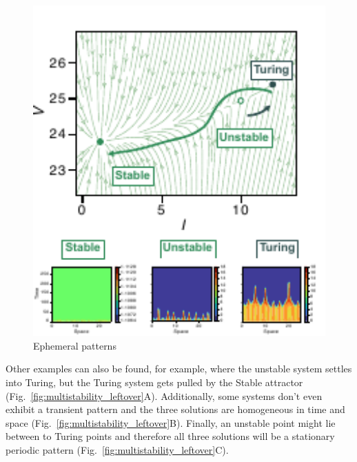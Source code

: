 \begin{figure}[H] %
    \centering
    \begin{adjustbox}{center}
        \includegraphics[width=1\textwidth]{chapters/Chapter 1/multistability2} %
    \end{adjustbox}
    \caption{Ephemeral patterns}
    \label{fig:multistability2} %
\end{figure}

Other examples can also be found, for example, where the unstable system settles into Turing, but the Turing system gets pulled by the Stable attractor (Fig.~\ref{fig:multistability_leftover}A). Additionally, some systems don't even exhibit a transient pattern and the three solutions are homogeneous in time and space (Fig.~\ref{fig:multistability_leftover}B). Finally, an unstable point might lie between to Turing points and therefore all three solutions will be a stationary periodic pattern (Fig.~\ref{fig:multistability_leftover}C).


